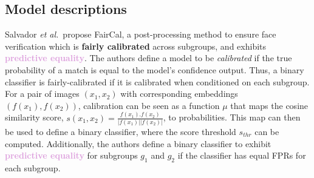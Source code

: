 \subsection{Model descriptions}
Salvador \textit{et al.}\ propose FairCal, a post-processing method to ensure face verification which is \textcolor{Bittersweet}{\textbf{fairly calibrated}} across subgroups, and exhibits \textcolor{Plum}{\textbf{predictive equality}}. The authors define a model to be \textit{calibrated} if the true probability of a match is equal to the model's confidence output. Thus, a binary classifier is fairly-calibrated if it is calibrated when conditioned on each subgroup. For a pair of images $(x_1, x_2)$ with corresponding embeddings $(f(x_1), f(x_2))$, calibration can be seen as a function $\mu$ that maps the cosine similarity score, $s(x_1, x_2)=\frac{f(x_1) . f(x_2)} {|f(x_1)| |f(x_2)|}$, to probabilities. This map can then be used to define a binary classifier, where the score threshold $s_{thr}$ can be computed. Additionally, the authors define a binary classifier to exhibit \textcolor{Plum}{\textbf{predictive equality}} for subgroups $g_1$ and $g_2$ if the classifier has equal FPRs for each subgroup.

